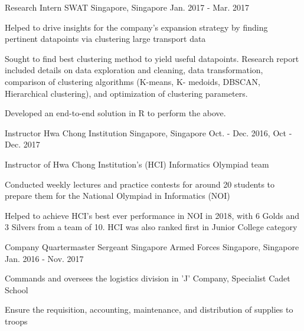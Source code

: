 \begin{cventries}
  \cventry
    {Research Intern} %
    {SWAT} %
    {Singapore, Singapore} %
    {Jan. 2017 - Mar. 2017} %
    {
      \begin{cvitems} %
      \item { Helped to drive insights for the company's expansion strategy by finding pertinent datapoints via clustering large transport data}
      \item { Sought to find best clustering method to yield useful datapoints. Research report included details on data exploration and cleaning, data transformation, comparison of clustering algorithms (K-means, K- medoids, DBSCAN, Hierarchical clustering), and optimization of clustering parameters.}
      \item { Developed an end-to-end solution in R to perform the above.}
      \end{cvitems}
    }

  \cventry
    {Instructor} %
    {Hwa Chong Institution} %
    {Singapore, Singapore} %
    {Oct. - Dec. 2016, Oct - Dec. 2017} %
    {
      \begin{cvitems} %
      \item { Instructor of Hwa Chong Institution’s (HCI) Informatics Olympiad team}
      \item { Conducted weekly lectures and practice contests for around 20 students to prepare them for the National Olympiad in Informatics (NOI)}
      \item { Helped to achieve HCI's best ever performance in NOI in 2018, with 6 Golds and 3 Silvers from a team of 10. HCI was also ranked first in Junior College category}
      \end{cvitems}
    }

  \cventry
    {Company Quartermaster Sergeant} %
    {Singapore Armed Forces} %
    {Singapore, Singapore} %
    {Jan. 2016 - Nov. 2017} %
    {
      \begin{cvitems} %
      \item {Commands and oversees the logistics division in ’J’ Company, Specialist Cadet School}
      \item {Ensure the requisition, accounting, maintenance, and distribution of supplies to troops}
      \end{cvitems}
    }

\end{cventries}

